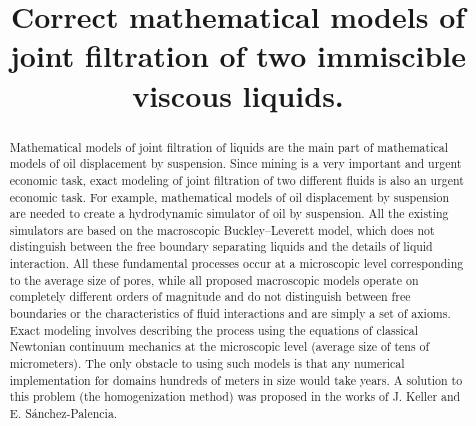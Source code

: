 \documentclass{article}
\theoremstyle{plain}
\theoremstyle{definition}
\numberwithin{equation}{section}
\begin{document}
\title{Correct mathematical models of joint filtration of two immiscible viscous liquids.}




    


    


\begin{abstract}
Mathematical models of joint filtration of liquids are the main part of mathematical models of oil displacement by suspension. Since mining is a very important and urgent economic task, exact modeling of joint filtration of
two different fluids is also an urgent economic task. For example,
mathematical models of oil displacement by suspension are needed to create a hydrodynamic simulator of oil by suspension. All the existing simulators are based on the macroscopic Buckley--Leverett model, which does not distinguish between the free boundary separating liquids and the details of liquid interaction. All these fundamental processes occur at a microscopic level corresponding to the average size of pores, while all proposed macroscopic models operate on completely different orders of magnitude and do not distinguish between free boundaries or the characteristics of fluid interactions and are simply a set of axioms.
Exact modeling involves describing the process using the equations of classical Newtonian continuum mechanics at the microscopic level (average size of tens of micrometers). The only obstacle to using such models is that any numerical implementation for domains hundreds of meters in size would take years. A solution to this problem (the homogenization method) was proposed in the works of J. Keller and E. Sánchez-Palencia.
\end{abstract}
\end{document}
